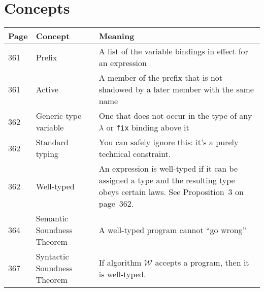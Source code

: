 \documentclass[12pt]{article}
\begin{document}
\section{Concepts}

\begin{tabular}{l l p{}}
\toprule
Page & Concept & Meaning \\
\midrule
361 & Prefix & A list of the variable bindings in effect for an expression \\
361 & Active & A member of the prefix that is not shadowed by a later member with the same name \\
362 & Generic type variable & One that does not occur in the type of any $\lambda$ or \texttt{fix} binding above it \\
362 & Standard typing & You can safely ignore this: it's a purely technical constraint. \\
362 & Well-typed & An expression is well-typed if it can be assigned a type and the resulting type obeys certain laws. See Proposition~3 on page~362.\\
364 & Semantic Soundness Theorem & A well-typed program cannot ``go wrong'' \\
367 & Syntactic Soundness Theorem & If algorithm $\mathscr{W}$ accepts a program, then it is well-typed. \\

\bottomrule
\end{tabular}
\end{document}

